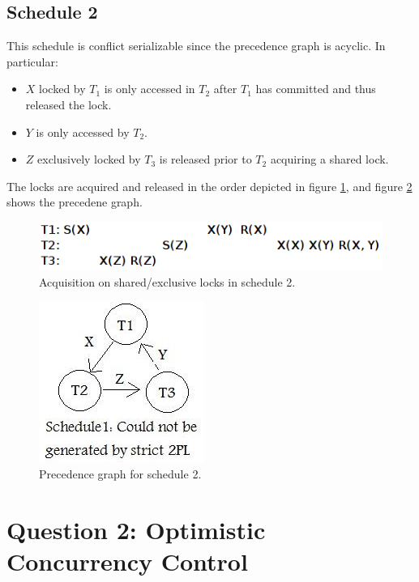 \documentclass[11pt]{article}
\begin{document}
\subsection*{Schedule 2}

This schedule is conflict serializable since the precedence graph is acyclic.
In particular:

\begin{itemize}
\item $X$ locked by $T_1$ is only accessed in $T_2$ after $T_1$ has committed
and thus released the lock.
\item $Y$ is only accessed by $T_2$.
\item $Z$ exclusively locked by $T_3$ is released prior to $T_2$ acquiring a
shared lock.
\end{itemize}

The locks are acquired and released in the order depicted in figure \ref{fig:acq},
and figure \ref{fig:s2} shows the precedene graph.

\begin{figure}[h!]
\begin{center}
\includegraphics[scale=0.45]{acquisition.png}
\caption{Acquisition on shared/exclusive locks in schedule 2.}
\label{fig:acq}
\end{center}
\end{figure}

\begin{figure}[h!]
\begin{center}
\includegraphics[scale=0.45]{2pl2.jpg}
\caption{Precedence graph for schedule 2.}
\label{fig:s2}
\end{center}
\end{figure}

\section*{Question 2: Optimistic Concurrency Control}
\end{document}
